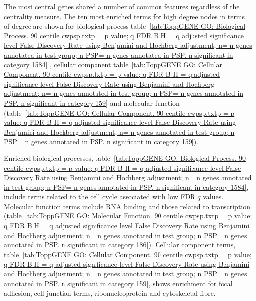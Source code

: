 The most central genes shared a number of common features regardless of the centrality measure. The ten most enriched terms for high degree nodes in terms of degree are shown for biological process table~\ref{tab:ToppGENE GO: Biological Process. 90 centile cwpsp.txtp = p value; q FDR B H = q adjusted significance level False Discovery Rate using Benjamini and Hochberg adjustment; n= n genes annotated in test group; n PSP= n genes annotated in PSP. n significant in category 1584} , cellular component table~\ref{tab:ToppGENE GO: Cellular Component. 90 centile cwpsp.txtp = p value; q FDR B H = q adjusted significance level False Discovery Rate using Benjamini and Hochberg adjustment; n= n genes annotated in test group; n PSP= n genes annotated in PSP. n significant in category 159} and molecular function (table~\ref{tab:ToppGENE GO: Cellular Component. 90 centile cwpsp.txtp = p value; q FDR B H = q adjusted significance level False Discovery Rate using Benjamini and Hochberg adjustment; n= n genes annotated in test group; n PSP= n genes annotated in PSP. n significant in category 159}). 

Enriched biological processes, table~\ref{tab:ToppGENE GO: Biological Process. 90 centile cwpsp.txtp = p value; q FDR B H = q adjusted significance level False Discovery Rate using Benjamini and Hochberg adjustment; n= n genes annotated in test group; n PSP= n genes annotated in PSP. n significant in category 1584}, include terms related to the cell cycle associated with low FDR $q$ values. Molecular function terms include RNA binding and those related to transcription (table~\ref{tab:ToppGENE GO: Molecular Function. 90 centile cwpsp.txtp = p value; q FDR B H = q adjusted significance level False Discovery Rate using Benjamini and Hochberg adjustment; n= n genes annotated in test group; n PSP= n genes annotated in PSP. n significant in category 186}). Cellular component terms, table~\ref{tab:ToppGENE GO: Cellular Component. 90 centile cwpsp.txtp = p value; q FDR B H = q adjusted significance level False Discovery Rate using Benjamini and Hochberg adjustment; n= n genes annotated in test group; n PSP= n genes annotated in PSP. n significant in category 159}, shows enrichment for focal adhesion, cell junction terms, ribonucleoprotein and cytoskeletal fibre. 




